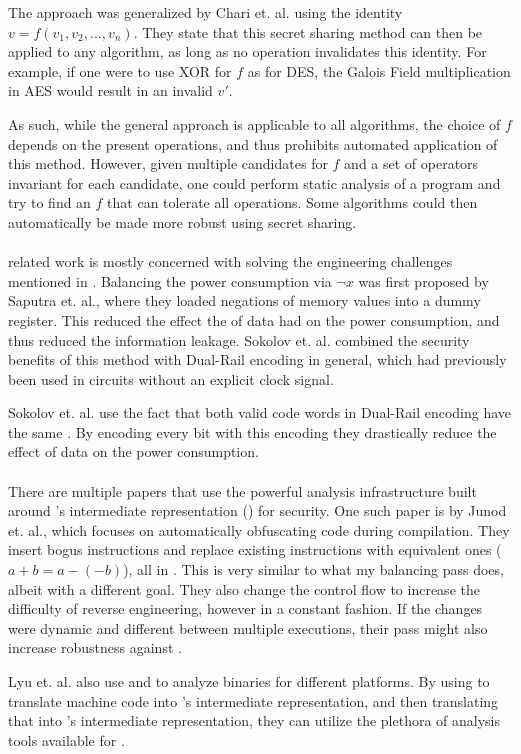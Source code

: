 The approach was generalized by Chari et. al.\cite{chari1999towards} using the identity $v=f(v_1,v_2,...,v_n)$.
They state that this secret sharing method can then be applied to any algorithm, as long as no operation invalidates this identity.
For example, if one were to use XOR for $f$ as for DES, the Galois Field multiplication in AES would result in an invalid $v'$.

As such, while the general approach is applicable to all algorithms, the choice of $f$ depends on the present operations, and thus prohibits automated application of this method.
However, given multiple candidates for $f$ and a set of operators invariant for each candidate, one could perform static analysis of a program and try to find an $f$ that can tolerate all operations.
Some algorithms could then automatically be made more robust using secret sharing.
\\
\\
\dual{} related work is mostly concerned with solving the engineering challenges mentioned in .
Balancing the power consumption via $\neg{x}$ was first proposed by Saputra et. al.\cite{saputra2003masking}, where they loaded negations of memory values into a dummy register.
This reduced the effect the \hammingw{} of data had on the power consumption, and thus reduced the information leakage.
Sokolov et. al.\cite{sokolov2005design} combined the security benefits of this method with Dual-Rail encoding in general, which had previously been used in circuits without an explicit clock signal\cite{moore2002improving}.

Sokolov et. al. use the fact that both valid code words in Dual-Rail encoding have the same \hammingw{}.
By encoding every bit with this encoding they drastically reduce the effect of data on the power consumption.
\\
\\
There are multiple papers that use the powerful analysis infrastructure built around \llvm{}'s intermediate representation (\ir{}) for security.
One such paper is by Junod et. al.\cite{junod2015obfuscator}, which focuses on automatically obfuscating code during compilation.
They insert bogus instructions and replace existing instructions with equivalent ones ($a+b = a - (-b)$), all in \ir{}.
This is very similar to what my balancing pass does, albeit with a different goal.
They also change the control flow to increase the difficulty of reverse engineering, however in a constant fashion.
If the changes were dynamic and different between multiple executions, their pass might also increase robustness against \poweranalysis{}.

Lyu et. al.\cite{lyu2014dbill} also use \llvm{} and \qemu{} to analyze binaries for different platforms.
By using \qemu{} to translate machine code into \qemu{}'s intermediate representation, and then translating that into \llvm{}'s intermediate representation, they can utilize the plethora of analysis tools available for \llvm{}.

